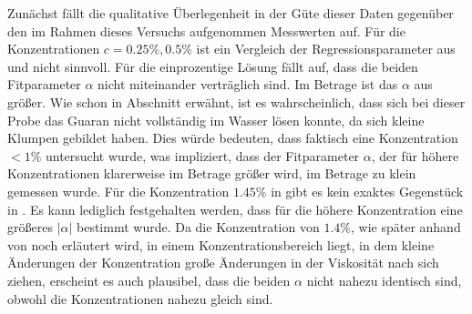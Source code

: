 \documentclass[11pt,a4paper,oneside]{scrartcl}
\begin{document}
Zunächst fällt die qualitative Überlegenheit in der Güte dieser Daten gegenüber den im Rahmen dieses Versuchs aufgenommen Messwerten auf. Für die Konzentrationen $c=0.25\%,0.5\%$ ist ein Vergleich der Regressionsparameter aus  und  nicht sinnvoll. Für die einprozentige Lösung fällt auf, dass die beiden Fitparameter $\alpha$ nicht miteinander verträglich sind. Im Betrage ist das $\alpha$ aus  größer. Wie schon in Abschnitt \label{anmischen_guaran} erwähnt, ist es wahrscheinlich, dass sich bei dieser Probe das Guaran nicht vollständig im Wasser lösen konnte, da sich kleine Klumpen gebildet haben. Dies würde bedeuten, dass faktisch eine Konzentration $<1\%$ untersucht wurde, was impliziert, dass der Fitparameter $\alpha$, der für höhere Konzentrationen klarerweise im Betrage größer wird, im Betrage zu klein gemessen wurde. Für die Konzentration $1.45\%$ in  gibt es kein exaktes Gegenstück in . Es kann lediglich festgehalten werden, dass für die höhere Konzentration eine größeres $|\alpha|$ bestimmt wurde. Da die Konzentration von $1.4\%$, wie später anhand von  noch erläutert wird, in einem Konzentrationsbereich liegt, in dem kleine Änderungen der Konzentration große Änderungen in der Viskosität nach sich ziehen,  erscheint es auch plausibel, dass die beiden $\alpha$ nicht nahezu identisch sind, obwohl die Konzentrationen nahezu gleich sind.




\par
\end{document}
